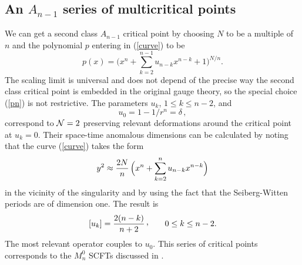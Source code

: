 \documentclass[a4paper,12pt]{article}
\def\cvp{\raise 2pt\hbox{,}}
\begin{document}
{\subsection{An $A_{n-1}$ series of multicritical points}
%
We can get a second class $A_{n-1}$ critical point by choosing $N$ to be a 
multiple of $n$ and the polynomial $p$ entering in (\ref{curve}) to be
%
\begin{equation}
\label{pn}
p(x) = \biggl( x^{n} + \sum_{k=2}^{n-1} u_{n-k} x^{n-k} + 1 \biggr)^{N/n}.
\end{equation}
%
The scaling limit is universal and does not depend of the precise way the 
second class critical point is embedded in the original gauge theory, so 
the special choice (\ref{pn}) is not restrictive. The parameters $u_{k}$, 
$1\leq k\leq n-2$, and 
%
\begin{equation}
\label{u0def}
u_{0}= 1-1/r^{n} = \delta\, ,
\end{equation}
%
correspond to ${\cal N}=2$ preserving relevant deformations around the 
critical point at $u_{k}=0$. Their space-time anomalous dimensions can
be calculated by noting that the curve (\ref{curve}) takes the form
%
\begin{equation}
\label{singcurve}
y^{2} \approx {2N\over n}\, \Bigl( x^{n} + \sum_{k=2}^{n} u_{n-k}x^{n-k}\Bigr)
\end{equation}
%
in the vicinity of the singularity and by using the fact that the 
Seiberg-Witten periods are of dimension one. The result is
%
\begin{equation}
\label{stdim}
[u_{k}] = {2(n-k)\over n+2}\, \cvp\qquad 0\leq k\leq n-2.
\end{equation}
%
The most relevant operator couples to $u_{0}$. This series of critical 
points corresponds to the $M_{n}^{0}$ SCFTs discussed in \cite{SCFT}.

}
\end{document}
